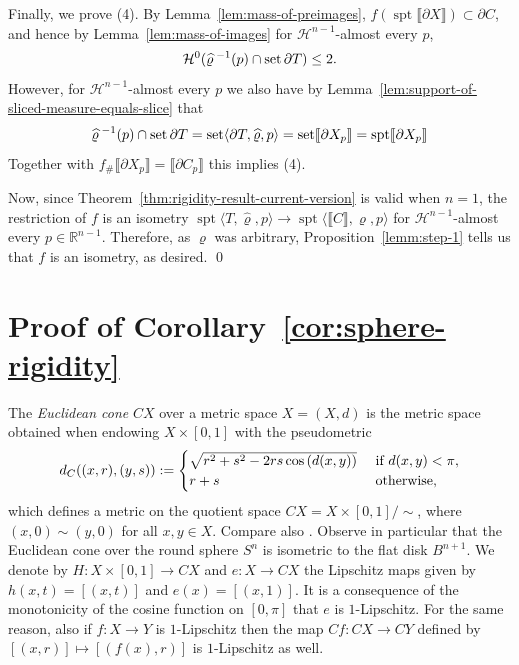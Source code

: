 \documentclass[reqno]{amsart}
\numberwithin{equation}{section}
\newcommand{\R}{\mathbb{R}}
\newcommand{\Ha}{\mathcal{H}}
\newcommand{\spt}{\operatorname{spt}}
\newcommand{\bb}[1]{\llbracket #1\rrbracket}
\DeclareMathOperator{\set}{set}
\renewcommand{\rho}{\varrho}
\begin{document}
Finally, we prove (4). By Lemma~\ref{lem:mass-of-preimages}, $f(\spt \bb{\partial X})\subset \partial C$, and hence by Lemma~\ref{lem:mass-of-images} for \(\Ha^{n-1}\)-almost every $p$, 
\[
\mathcal{H}^0(\widehat{\rho}^{\hspace{0.2em}-1}(p)\cap \set \partial T)\leq 2.
\]
However, for \(\Ha^{n-1}\)-almost every $p$ we also have by Lemma~\ref{lem:support-of-sliced-measure-equals-slice} that \[\widehat{\rho}^{\hspace{0.2em}-1}(p)\cap \set \partial T =\set \langle \partial T, \widehat{\rho},p \rangle =\set \bb{ \partial X_p}=\spt \bb{ \partial X_p}
\]
Together with \(f_\# \bb{\partial X_p}=\bb{\partial C_p}\) this implies (4). 

Now, since Theorem~\ref{thm:rigidity-result-current-version} is valid when \(n=1\), the restriction of \(f\) is an isometry $\spt \langle T ,\widehat{\rho}, p \rangle \to \spt \langle \bb{C} ,\rho,p \rangle$ for \(\Ha^{n-1}\)-almost every \(p\in \R^{n-1}\). Therefore, as \(\rho\) was arbitrary, Proposition~\ref{lemm:step-1} tells us that \(f\) is an isometry, as desired. \qed


\section{Proof of Corollary~\ref{cor:sphere-rigidity}}\label{sec:5}
The \emph{Euclidean cone} $CX$ over a metric space $X=(X,d)$ is the metric space obtained when endowing $X\times [0,1]$ with the pseudometric
\begin{equation}
    d_C((x,r),(y,s)):=\begin{cases}
    \sqrt{r^2+s^2-2rs\cos\left(d(x,y)\right)} &\textnormal{ if }d(x,y)<\pi,\\
    r+s &\textnormal{ otherwise,}
    \end{cases}
\end{equation}
which defines a metric on the quotient space $CX=X\times [0,1]/\sim$, where $(x,0)\sim (y,0)$ for all $x,y\in X$. Compare also \cite[Section 3.6]{burago2022course}. Observe in particular that the Euclidean cone over the round sphere $S^n$ is isometric to the flat disk $B^{n+1}$. We denote by $H\colon X\times [0,1]\to CX$ and $e\colon X \to CX$ the Lipschitz maps given by $h(x,t)=[(x,t)]$ and $e(x)=[(x,1)]$. It is a consequence of the monotonicity of the cosine function on $[0,\pi]$ that $e$ is $1$-Lipschitz. For the same reason, also if $f\colon X\to Y$ is $1$-Lipschitz then the map $Cf\colon CX \to CY$ defined by \([(x,r)]\mapsto [(f(x), r)]\) is $1$-Lipschitz as well. 
\end{document}

